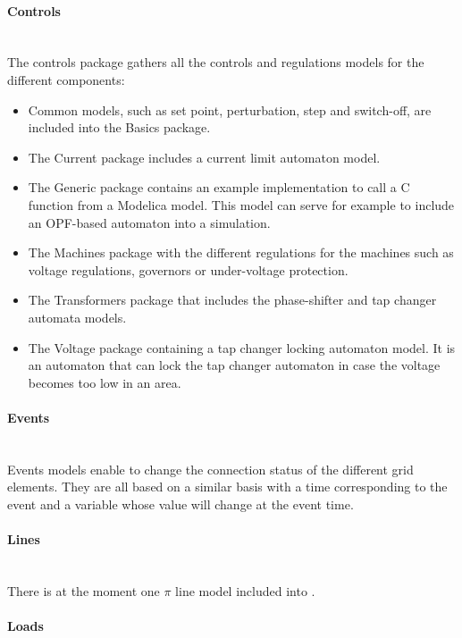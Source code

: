 \documentclass[a4paper, 12pt]{report}
\begin{document}
\paragraph{Controls}
~~\\

The controls package gathers all the controls and regulations models for the different components:
\begin{itemize}
\item Common models, such as set point, perturbation, step and switch-off, are included into the Basics package.
\item The Current package includes a current limit automaton model.
\item The Generic package contains an example implementation to call a C function from a Modelica model. This model can serve for example to include an OPF-based automaton into a \Dynawo simulation.
\item The Machines package with the different regulations for the machines such as voltage  regulations, governors or under-voltage protection.
\item The Transformers package that includes the phase-shifter and tap changer automata models.
\item The Voltage package containing a tap changer locking automaton model. It is an automaton that can lock the tap changer automaton in case the voltage becomes too low in an area.
\end{itemize}

\paragraph{Events}
~~\\

Events models enable to change the connection status of the different grid elements. They are all based on a similar basis with a time corresponding to the event and a variable whose value will change at the event time.

\paragraph{Lines}
~~\\

There is at the moment one $\pi$ line model included into \Dynawo.

\paragraph{Loads}
~~\\
\end{document}
